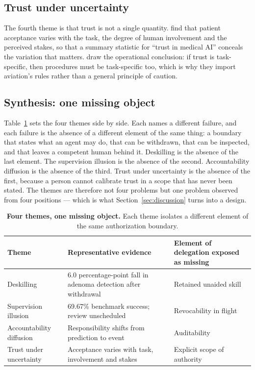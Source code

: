 \subsection{Trust under uncertainty}
The fourth theme is that trust is not a single quantity. \citet{busch2025attitudes} find that patient acceptance varies with the task, the degree of human involvement and the perceived stakes, so that a summary statistic for ``trust in medical AI'' conceals the variation that matters. \citet{ong2026flight} draw the operational conclusion: if trust is task-specific, then procedures must be task-specific too, which is why they import aviation's rules rather than a general principle of caution.

\subsection{Synthesis: one missing object}
Table~\ref{tab:themes} sets the four themes side by side. Each names a different failure, and each failure is the absence of a different element of the same thing: a boundary that states what an agent may do, that can be withdrawn, that can be inspected, and that leaves a competent human behind it. Deskilling is the absence of the last element. The supervision illusion is the absence of the second. Accountability diffusion is the absence of the third. Trust under uncertainty is the absence of the first, because a person cannot calibrate trust in a scope that has never been stated. The themes are therefore not four problems but one problem observed from four positions --- which is what Section~\ref{sec:discussion} turns into a design.

\begin{table}[t]
\centering\small
\setlength{\tabcolsep}{6pt}
\begin{tabular}{@{}p{3.9cm}p{5.0cm}p{5.3cm}@{}}
\toprule
Theme & Representative evidence & Element of delegation exposed as missing \\
\midrule
Deskilling              & 6.0 percentage-point fall in adenoma detection after withdrawal \citep{budzyn2025deskilling} & Retained unaided skill \\
Supervision illusion    & 69.67\% benchmark success; review unscheduled \citep{jiang2025medagentbench} & Revocability in flight \\
Accountability diffusion& Responsibility shifts from prediction to event \citep{habli2020accountability} & Auditability \\
Trust under uncertainty & Acceptance varies with task, involvement and stakes \citep{busch2025attitudes} & Explicit scope of authority \\
\bottomrule
\end{tabular}
\caption{\textbf{Four themes, one missing object.} Each theme isolates a different element of the same authorization boundary.}
\label{tab:themes}
\end{table}
